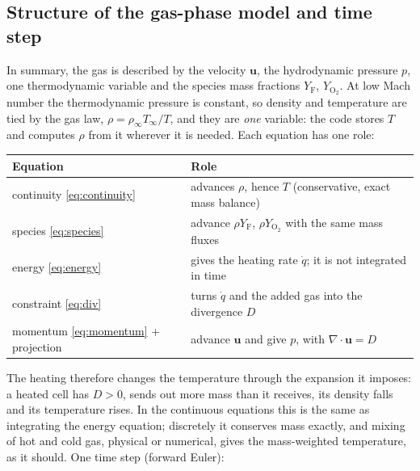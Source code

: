 \documentclass[11pt,a4paper]{article}
\newcommand{\vu}{\mathbf{u}}
\newcommand{\Yf}{Y_\text{F}}
\newcommand{\YO}{Y_{\mathrm{O_2}}}
\begin{document}
\subsection{Structure of the gas-phase model and time step}\label{sec:structure}
In summary, the gas is described by the velocity $\vu$, the hydrodynamic pressure $p$, one thermodynamic variable
and the species mass fractions $\Yf$, $\YO$. At low Mach number the thermodynamic pressure is
constant, so density and temperature are tied by the gas law, $\rho=\rho_\infty T_\infty/T$, and they
are \emph{one} variable: the code stores $T$ and computes $\rho$ from it wherever it is needed. Each
equation has one role:
\begin{center}
\begin{tabular}{p{5.0cm}p{9.6cm}}
\toprule
Equation & Role \\
\midrule
continuity \eqref{eq:continuity} & advances $\rho$, hence $T$ (conservative, exact mass balance) \\
species \eqref{eq:species} & advance $\rho\Yf$, $\rho\YO$ with the same mass fluxes \\
energy \eqref{eq:energy} & gives the heating rate $\dot q$; it is not integrated in time \\
constraint \eqref{eq:div} & turns $\dot q$ and the added gas into the divergence $D$ \\
momentum \eqref{eq:momentum} + projection & advance $\vu$ and give $p$, with $\nabla\cdot\vu=D$ \\
\bottomrule
\end{tabular}
\end{center}
The heating therefore changes the temperature through the expansion it imposes: a heated cell has
$D>0$, sends out more mass than it receives, its density falls and its temperature rises. In the
continuous equations this is the same as integrating the energy equation; discretely it conserves
mass exactly, and mixing of hot and cold gas, physical or numerical, gives the mass-weighted
temperature, as it should. One time step (forward Euler):
\end{document}
